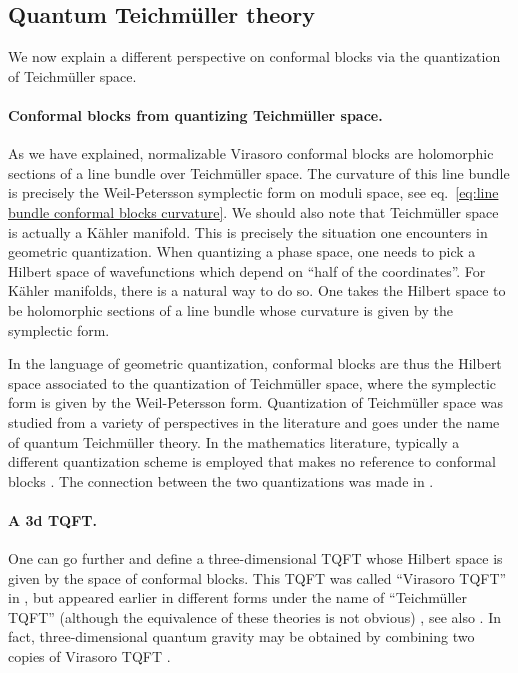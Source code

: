 \documentclass[12pt,a4paper]{article}
\begin{document}
\subsection{Quantum Teichm\"uller theory} \label{subsec:quantum Teichmuller theory}
We now explain a different perspective on conformal blocks via the quantization of Teichm\"uller space. 

\paragraph{Conformal blocks from quantizing Teichm\"uller space.}
As we have explained, normalizable Virasoro conformal blocks are holomorphic sections of a line bundle over Teichm\"uller space. The curvature of this line bundle is precisely the Weil-Petersson symplectic form on moduli space, see eq.~\eqref{eq:line bundle conformal blocks curvature}.
We should also note that Teichm\"uller space is actually a K\"ahler manifold. 
This is precisely the situation one encounters in geometric quantization. When quantizing a phase space, one needs to pick a Hilbert space of wavefunctions which depend on ``half of the coordinates''. For K\"ahler manifolds, there is a natural way to do so. One takes the Hilbert space to be holomorphic sections of a line bundle whose curvature is given by the symplectic form. 

In the language of geometric quantization, conformal blocks are thus the Hilbert space associated to the quantization of Teichm\"uller space, where the symplectic form is given by the Weil-Petersson form.
Quantization of Teichm\"uller space was studied from a variety of perspectives in the literature and goes under the name of quantum Teichm\"uller theory. In the mathematics literature, typically a different quantization scheme is employed that makes no reference to conformal blocks \cite{Kashaev:1998fc, Chekhov:1999tn}. The connection between the two quantizations was made in \cite{Teschner:2005bz, Teschner:2013tqy}.

\paragraph{A 3d TQFT.} One can go further and define a three-dimensional TQFT whose Hilbert space is given by the space of conformal blocks. This TQFT was called ``Virasoro TQFT'' in \cite{Collier:2023fwi}, but appeared earlier in different forms under the name of ``Teichm\"uller TQFT'' (although the equivalence of these theories is not obvious) \cite{EllegaardAndersen:2011vps}, see also \cite{Teschner:2005bz}. In fact, three-dimensional quantum gravity may be obtained by combining two copies of Virasoro TQFT \cite{Collier:2023fwi}.
\end{document}
